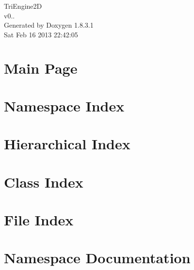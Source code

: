\documentclass{book}
\begin{document}
\hypersetup{pageanchor=false,citecolor=blue}
\begin{titlepage}
\vspace*{7cm}
\begin{center}
{\Large Tri\-Engine2\-D \\[1ex]\large v0.. }\\
\vspace*{1cm}
{\large Generated by Doxygen 1.8.3.1}\\
\vspace*{0.5cm}
{\small Sat Feb 16 2013 22:42:05}\\
\end{center}
\end{titlepage}
\clearemptydoublepage
{}
\tableofcontents
\clearemptydoublepage
{}
\hypersetup{pageanchor=true,citecolor=blue}
\chapter{Main Page}
\label{index}\hypertarget{index}{}
\chapter{Namespace Index}

\chapter{Hierarchical Index}

\chapter{Class Index}

\chapter{File Index}

\chapter{Namespace Documentation}














\end{document}
